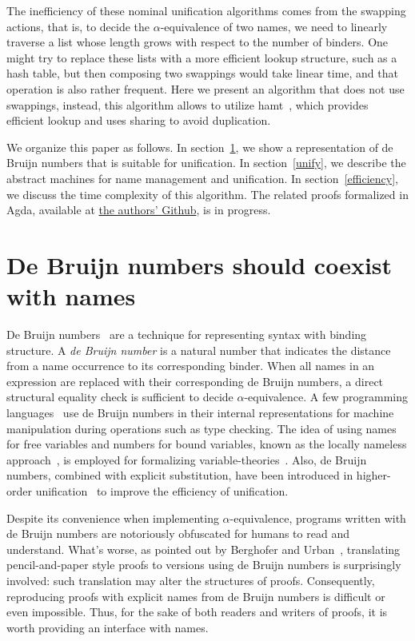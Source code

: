 \documentclass[a4paper,UKenglish]{lipics-v2016}
\begin{document}
The inefficiency of these nominal unification algorithms comes from
the swapping actions, that is, to decide the $\alpha$-equivalence of
two names, we need to linearly traverse a list whose length grows with
respect to the number of binders.  One might try to replace these
lists with a more efficient lookup structure, such as a hash table,
but then composing two swappings would take linear time, and that
operation is also rather frequent.  Here we present an algorithm that
does not use swappings, instead, this algorithm allows to utilize
hamt~\cite{bagwell_ideal_2001}, which provides efficient lookup and
uses sharing to avoid duplication.

We organize this paper as follows.  In section~\ref{closures}, we show
a representation of de Bruijn numbers that is suitable for
unification.  In section~\ref{unify}, we describe the abstract
machines for name management and unification.  In
section~\ref{efficiency}, we discuss the time complexity of this
algorithm.  The related proofs formalized in Agda, available at
\href{https://github.com/mvcccccc/UNIF2018}{the authors' Github}, is
in progress.
  

\section{De Bruijn numbers should coexist with names}
\label{closures}

De Bruijn numbers~\cite{de_bruijn_lambda_1972} are a technique for
representing syntax with binding structure.  A \emph{de Bruijn number}
is a natural number that indicates the distance from a name occurrence
to its corresponding binder.  When all names in an expression are
replaced with their corresponding de Bruijn numbers, a direct
structural equality check is sufficient to decide
$\alpha$-equivalence.  A few programming
languages~\cite{norell_towards_2007} use de Bruijn numbers in their
internal representations for machine manipulation during operations
such as type checking.  The idea of using names for free variables and
numbers for bound variables, known as the locally nameless
approach~\cite{chargueraud_locally_2012}, is employed for formalizing
variable-theories~\cite{aydemir_nominal_2006,
  aydemir_engineering_2008}.  Also, de Bruijn numbers, combined with
explicit substitution, have been introduced in higher-order
unification~\cite{dowek_higher_2000} to improve the efficiency of
unification.

Despite its convenience when implementing $\alpha$-equivalence,
programs written with de Bruijn numbers are notoriously obfuscated for
humans to read and understand.  What's worse, as pointed out by
Berghofer and Urban~\cite{berghofer_head--head_2007}, translating
pencil-and-paper style proofs to versions using de Bruijn numbers is
surprisingly involved: such translation may alter the structures of
proofs.  Consequently, reproducing proofs with explicit names from de
Bruijn numbers is difficult or even impossible.  Thus, for the sake of
both readers and writers of proofs, it is worth providing an interface
with names.
\end{document}
